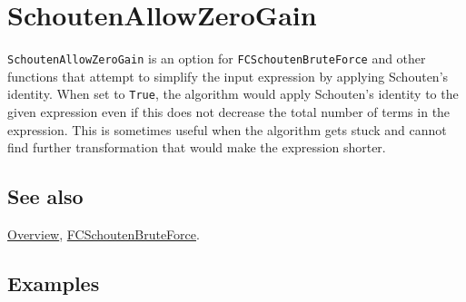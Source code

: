 \documentclass[../FeynCalcManual.tex]{subfiles}
\begin{document}
\hypertarget{schoutenallowzerogain}{
\section{SchoutenAllowZeroGain}\label{schoutenallowzerogain}}

\texttt{SchoutenAllowZeroGain} is an option for
\texttt{FCSchoutenBruteForce} and other functions that attempt to
simplify the input expression by applying Schouten's identity. When set
to \texttt{True}, the algorithm would apply Schouten's identity to the
given expression even if this does not decrease the total number of
terms in the expression. This is sometimes useful when the algorithm
gets stuck and cannot find further transformation that would make the
expression shorter.

\subsection{See also}

\hyperlink{toc}{Overview},
\hyperlink{fcschoutenbruteforce}{FCSchoutenBruteForce}.

\subsection{Examples}
\end{document}

